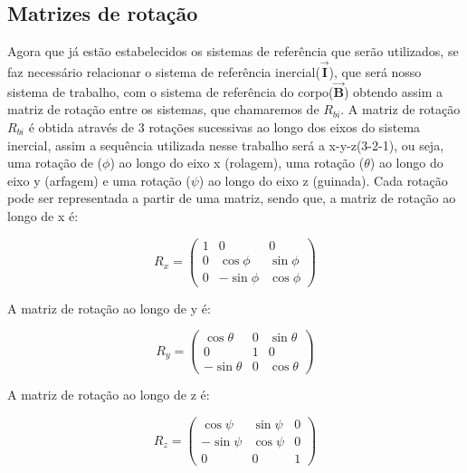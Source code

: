 \subsection{Matrizes de rotação}
Agora que já estão estabelecidos os sistemas de referência que serão utilizados, se faz necessário relacionar o sistema de referência inercial($\boldsymbol{\vec{I}}$), que será nosso sistema de trabalho, com o sistema de referência do corpo($\boldsymbol{\vec{B}}$) obtendo assim a matriz de rotação entre os sistemas, que chamaremos de $R_{bi}$.
A matriz de rotação $R_{bi}$ é obtida através de 3 rotações sucessivas ao longo dos eixos do sistema inercial, assim a sequência utilizada nesse trabalho será a x-y-z(3-2-1), ou seja, uma rotação de ($\phi$) ao longo do eixo x (rolagem), uma rotação ($\theta$) ao longo do eixo y (arfagem) e uma rotação ($\psi$) ao longo do eixo z (guinada).
Cada rotação pode ser representada a partir de uma matriz, sendo que, a  matriz de rotação ao longo de x é:

\begin{equation*}
	R_x = \begin{pmatrix}
		1 & 0         & 0        \\
		0 & \cos\phi  & \sin\phi \\
		0 & -\sin\phi & \cos\phi
	\end{pmatrix}
\end{equation*}

A  matriz de rotação ao longo de y é:

\begin{equation*}
	R_y = \begin{pmatrix}
		\cos\theta  & 0 & \sin\theta \\
		0           & 1 & 0          \\
		-\sin\theta & 0 & \cos\theta
	\end{pmatrix}
\end{equation*}

A  matriz de rotação ao longo de z é:

\begin{equation*}
	R_z = \begin{pmatrix}
		\cos\psi  & \sin\psi & 0 \\
		-\sin\psi & \cos\psi & 0 \\
		0         & 0        & 1
	\end{pmatrix}
\end{equation*}

